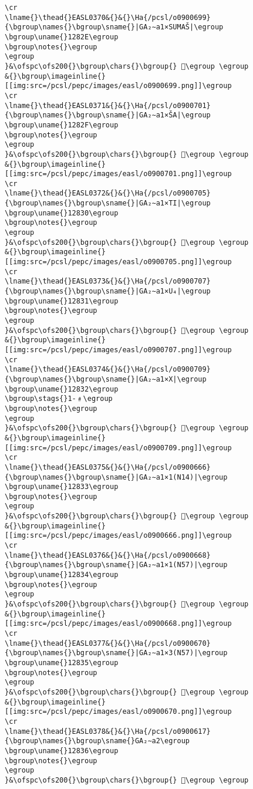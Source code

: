 \begin{verbatim}
\cr
\lname{}\thead{}EASL0370&{}&{}\Ha{/pcsl/o0900699}{\bgroup\names{}\bgroup\sname{}|GA₂∼a1×SUMAŠ|\egroup
\bgroup\uname{}1282E\egroup
\bgroup\notes{}\egroup
\egroup
}&\ofspc\ofs200{}\bgroup\chars{}\bgroup{} 𒠮\egroup \egroup
&{}\bgroup\imageinline{}[[img:src=/pcsl/pepc/images/easl/o0900699.png]]\egroup
\cr
\lname{}\thead{}EASL0371&{}&{}\Ha{/pcsl/o0900701}{\bgroup\names{}\bgroup\sname{}|GA₂∼a1×ŠA|\egroup
\bgroup\uname{}1282F\egroup
\bgroup\notes{}\egroup
\egroup
}&\ofspc\ofs200{}\bgroup\chars{}\bgroup{} 𒠯\egroup \egroup
&{}\bgroup\imageinline{}[[img:src=/pcsl/pepc/images/easl/o0900701.png]]\egroup
\cr
\lname{}\thead{}EASL0372&{}&{}\Ha{/pcsl/o0900705}{\bgroup\names{}\bgroup\sname{}|GA₂∼a1×TI|\egroup
\bgroup\uname{}12830\egroup
\bgroup\notes{}\egroup
\egroup
}&\ofspc\ofs200{}\bgroup\chars{}\bgroup{} 𒠰\egroup \egroup
&{}\bgroup\imageinline{}[[img:src=/pcsl/pepc/images/easl/o0900705.png]]\egroup
\cr
\lname{}\thead{}EASL0373&{}&{}\Ha{/pcsl/o0900707}{\bgroup\names{}\bgroup\sname{}|GA₂∼a1×U₄|\egroup
\bgroup\uname{}12831\egroup
\bgroup\notes{}\egroup
\egroup
}&\ofspc\ofs200{}\bgroup\chars{}\bgroup{} 𒠱\egroup \egroup
&{}\bgroup\imageinline{}[[img:src=/pcsl/pepc/images/easl/o0900707.png]]\egroup
\cr
\lname{}\thead{}EASL0374&{}&{}\Ha{/pcsl/o0900709}{\bgroup\names{}\bgroup\sname{}|GA₂∼a1×X|\egroup
\bgroup\uname{}12832\egroup
\bgroup\stags{}1-﹟\egroup
\bgroup\notes{}\egroup
\egroup
}&\ofspc\ofs200{}\bgroup\chars{}\bgroup{} 𒠲\egroup \egroup
&{}\bgroup\imageinline{}[[img:src=/pcsl/pepc/images/easl/o0900709.png]]\egroup
\cr
\lname{}\thead{}EASL0375&{}&{}\Ha{/pcsl/o0900666}{\bgroup\names{}\bgroup\sname{}|GA₂∼a1×1(N14)|\egroup
\bgroup\uname{}12833\egroup
\bgroup\notes{}\egroup
\egroup
}&\ofspc\ofs200{}\bgroup\chars{}\bgroup{} 𒠳\egroup \egroup
&{}\bgroup\imageinline{}[[img:src=/pcsl/pepc/images/easl/o0900666.png]]\egroup
\cr
\lname{}\thead{}EASL0376&{}&{}\Ha{/pcsl/o0900668}{\bgroup\names{}\bgroup\sname{}|GA₂∼a1×1(N57)|\egroup
\bgroup\uname{}12834\egroup
\bgroup\notes{}\egroup
\egroup
}&\ofspc\ofs200{}\bgroup\chars{}\bgroup{} 𒠴\egroup \egroup
&{}\bgroup\imageinline{}[[img:src=/pcsl/pepc/images/easl/o0900668.png]]\egroup
\cr
\lname{}\thead{}EASL0377&{}&{}\Ha{/pcsl/o0900670}{\bgroup\names{}\bgroup\sname{}|GA₂∼a1×3(N57)|\egroup
\bgroup\uname{}12835\egroup
\bgroup\notes{}\egroup
\egroup
}&\ofspc\ofs200{}\bgroup\chars{}\bgroup{} 𒠵\egroup \egroup
&{}\bgroup\imageinline{}[[img:src=/pcsl/pepc/images/easl/o0900670.png]]\egroup
\cr
\lname{}\thead{}EASL0378&{}&{}\Ha{/pcsl/o0900617}{\bgroup\names{}\bgroup\sname{}GA₂∼a2\egroup
\bgroup\uname{}12836\egroup
\bgroup\notes{}\egroup
\egroup
}&\ofspc\ofs200{}\bgroup\chars{}\bgroup{} 𒠶\egroup \egroup

\end{verbatim}
